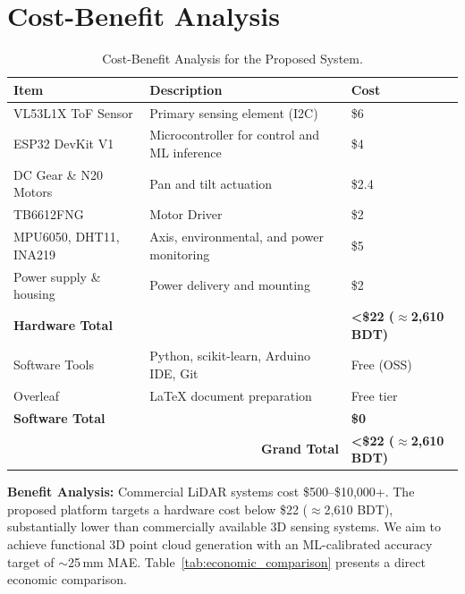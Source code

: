 \documentclass[12pt,a4paper]{article}
\begin{document}

    \section{Cost-Benefit Analysis}

    \begin{table}[H]
    \centering
    \caption{Cost-Benefit Analysis for the Proposed System.}
    \label{tab:cost_benefit}
    \begin{tabularx}{\textwidth}{|p{1.5in}|X|p{1.0in}|}
    \hline
    \textbf{Item} & \textbf{Description} & \textbf{Cost} \\
    \hline
    VL53L1X ToF Sensor & Primary sensing element (I2C) & \$6 \\
    \hline
    ESP32 DevKit V1 & Microcontroller for control and ML inference & \$4 \\
    \hline
    DC Gear \& N20 Motors & Pan and tilt actuation & \$2.4 \\
    \hline
    TB6612FNG & Motor Driver & \$2 \\
    \hline
    MPU6050, DHT11, INA219 & Axis, environmental, and power monitoring & \$5 \\
    \hline
    Power supply \& housing & Power delivery and mounting & \$2 \\
    \hline
    \textbf{Hardware Total} & & \textbf{<\$22 ($\approx$2,610 BDT)} \\
    \hline
    \hline
    Software Tools & Python, scikit-learn, Arduino IDE, Git & Free (OSS) \\
    \hline
    Overleaf & LaTeX document preparation & Free tier \\
    \hline
    \textbf{Software Total} & & \textbf{\$0} \\
    \hline
    \hline
    \multicolumn{2}{|r|}{\textbf{Grand Total}} & \textbf{<\$22 ($\approx$2,610 BDT)} \\
    \hline
    \end{tabularx}
    \end{table}

    \textbf{Benefit Analysis:} Commercial LiDAR systems cost \$500--\$10,000+. The proposed platform targets a hardware cost below \$22 ($\approx$2,610 BDT), substantially lower than commercially available 3D sensing systems. We aim to achieve functional 3D point cloud generation with an ML-calibrated accuracy target of $\sim$25\,mm MAE. Table~\ref{tab:economic_comparison} presents a direct economic comparison.
\end{document}
